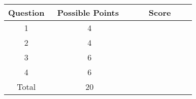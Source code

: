 \documentclass{article}
\theoremstyle{definition}
\begin{document}
\vspace{1.5cm}



\begin{center}

{\renewcommand{\arraystretch}{2.5}
\begin{tabular}{|c|c|c|}
\hline
Question & \ Possible Points \ & \ \ \ Score \ \ \ \\
\hline 

1 & 4 & \\
\hline 

2 & 4 & \\
\hline

3 & 6 & \\
\hline

4 & 6 & \\
\hline 

Total & 20 & \\
\hline

\end{tabular}}

\end{center}


\newpage \label{Question 1}


\end{document}
